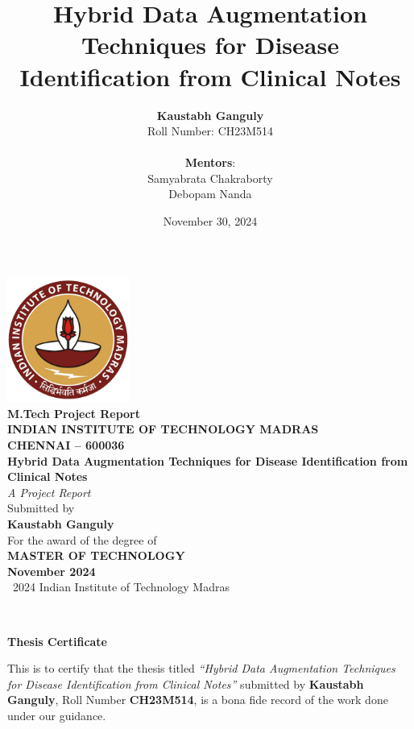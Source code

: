 \documentclass[12pt,a4paper]{report}
\title{\textbf{Hybrid Data Augmentation Techniques for Disease Identification from Clinical Notes}}
\author{
    \textbf{Kaustabh Ganguly} \\
    Roll Number: CH23M514 \\
    \\
    \textbf{Mentors}: \\
    Samyabrata Chakraborty \\
    Debopam Nanda \\
}
\date{November 30, 2024}
\begin{document}
\begin{titlepage}
    \centering
    \includegraphics[width=4cm]{logo.png} \\
    \vspace{0.5cm}
    {\large \bfseries M.Tech Project Report\\
    INDIAN INSTITUTE OF TECHNOLOGY MADRAS \\
    CHENNAI -- 600036} \\
    \vspace{1.5cm}
    {\huge \bfseries Hybrid Data Augmentation Techniques for Disease Identification from Clinical Notes} \\
    \vspace{2cm}
    {\Large \textit{A Project Report}} \\
    \vspace{0.5cm}
    {\large Submitted by} \\
    \vspace{0.5cm}
    {\Large \bfseries Kaustabh Ganguly} \\
    \vspace{0.5cm}
    {\large For the award of the degree of} \\
    \vspace{0.5cm}
    {\Large \bfseries MASTER OF TECHNOLOGY} \\
    \vspace{1.5cm}
    {\large \bfseries November 2024} \\
    \vfill
    {\small \textcopyright~2024 Indian Institute of Technology Madras}
\end{titlepage}

\newpage
~\vfill
\begin{center}
    \textbf{Thesis Certificate}
\end{center}
\vspace{0.5in}
This is to certify that the thesis titled \textit{``Hybrid Data Augmentation Techniques for Disease Identification from Clinical Notes''} submitted by \textbf{Kaustabh Ganguly}, Roll Number \textbf{CH23M514}, is a bona fide record of the work done under our guidance. \\
\end{document}
